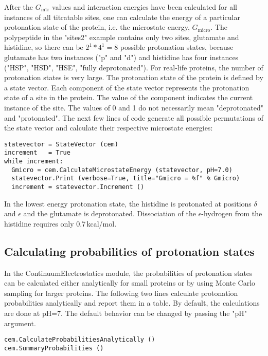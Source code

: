 \documentclass[a4paper,11pt]{article}
\newcommand{\modulename}{ContinuumElectrostatics\xspace}
\begin{document}
{After the $G_{\mathrm{intr}}$ values and interaction energies have been calculated 
for all instances of all titratable sites, 
one can calculate the energy of a particular protonation state of the protein, i.e. 
the microstate energy, $G_{\mathrm{micro}}$.
%
The polypeptide in the "sites2" example contains only two sites, 
glutamate and histidine,
so there can be $2^1 * 4^1 = 8$ possible protonation states, because glutamate has two
instances ("p" and "d") and histidine has four instances ("HSP", "HSD", "HSE", "fully deprotonated").
%
For real-life proteins, the number of protonation states is very large.
%
The protonation state of the protein is defined by a state vector.
%
Each component of the state vector represents the protonation state of a site in the protein.
%
The value of the component indicates the current instance of the site.
%
The values of 0 and 1 do not necessarily mean "deprotonated" and "protonated".
%
The next few lines of code generate all possible permutations of the state vector and calculate
their respective microstate energies:

{\footnotesize \begin{lstlisting}
statevector = StateVector (cem)
increment   = True
while increment:
  Gmicro = cem.CalculateMicrostateEnergy (statevector, pH=7.0)
  statevector.Print (verbose=True, title="Gmicro = %f" % Gmicro)
  increment = statevector.Increment ()
\end{lstlisting} }

\bigskip
In the lowest energy protonation state, the histidine is protonated at 
positions $\delta$ and $\epsilon$ and the glutamate is deprotonated.
%
Dissociation of the $\epsilon$-hydrogen from the histidine requires only 0.7\,kcal/mol.


\subsection{Calculating probabilities of protonation states}
In the \modulename module, 
the probabilities of protonation states 
can be calculated either analytically for small proteins 
or by using Monte Carlo sampling for larger proteins.
%
The following two lines calculate protonation probabilities analytically and report them
in a table.
%
By default, the calculations are done at pH=7.
%
The default behavior can be changed by passing the "pH" argument. 

{\footnotesize \begin{lstlisting}
cem.CalculateProbabilitiesAnalytically ()
cem.SummaryProbabilities ()
\end{lstlisting} }


}
\end{document}
